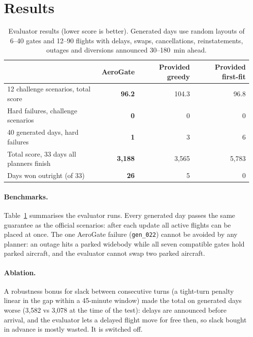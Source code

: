 \documentclass[11pt]{article}
\theoremstyle{remark}
\begin{document}
\section{Results}\label{sec:results}
\begin{table}[htbp]
\centering
\caption{Evaluator results (lower score is better). Generated days use random layouts of 6--40 gates
and 12--90 flights with delays, swaps, cancellations, reinstatements, outages and diversions announced
30--180~min ahead.}
\label{tab:bench}
\begin{tabular}{lrrr}
\toprule
 & AeroGate & Provided greedy & Provided first-fit\\
\midrule
12 challenge scenarios, total score & \textbf{96.2} & 104.3 & 96.8\\
Hard failures, challenge scenarios & \textbf{0} & 0 & 0\\
40 generated days, hard failures & \textbf{1} & 3 & 6\\
Total score, 33 days all planners finish & \textbf{3{,}188} & 3{,}565 & 5{,}783\\
Days won outright (of 33) & \textbf{26} & 5 & 0\\
\bottomrule
\end{tabular}
\end{table}

\paragraph{Benchmarks.} Table~\ref{tab:bench} summarises the evaluator runs. Every generated day passes
the same guarantee as the official scenarios: after each update all active flights can be placed at
once. The one AeroGate failure (\texttt{gen\_022}) cannot be avoided by any planner: an outage hits a
parked widebody while all seven compatible gates hold parked aircraft, and the evaluator cannot swap
two parked aircraft.

\paragraph{Ablation.} A robustness bonus for slack between consecutive turns (a tight-turn penalty
linear in the gap within a 45-minute window) made the total on generated days worse (3{,}582 vs
3{,}078 at the time of the test): delays are announced before arrival, and the evaluator lets a delayed
flight move for free then, so slack bought in advance is mostly wasted. It is switched off.
\end{document}
